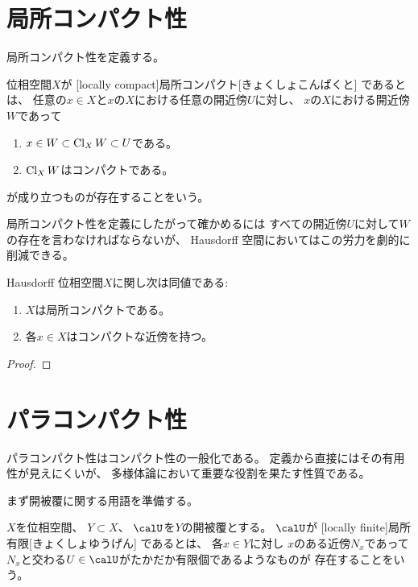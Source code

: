 \documentclass[report]{jlreq}
\begin{document}
\section{局所コンパクト性}

局所コンパクト性を定義する。

\begin{definition}[局所コンパクト]
    位相空間$X$が
    [locally compact]{局所コンパクト}[きょくしょこんぱくと]
    であるとは、
    任意の$x \in X$と$x$の$X$における任意の開近傍$U$に対し、
    $x$の$X$における開近傍$W$であって
    \begin{enumerate}
        \item $x \in W \subset \operatorname{Cl}_X W \subset U$である。
        \item $\operatorname{Cl}_X W$はコンパクトである。
    \end{enumerate}
    が成り立つものが存在することをいう。
\end{definition}

局所コンパクト性を定義にしたがって確かめるには
すべての開近傍$U$に対して$W$の存在を言わなければならないが、
Hausdorff 空間においてはこの労力を劇的に削減できる。

\begin{proposition}
    Hausdorff 位相空間$X$に関し次は同値である:
    \begin{enumerate}
        \item $X$は局所コンパクトである。
        \item 各$x \in X$はコンパクトな近傍を持つ。
    \end{enumerate}
\end{proposition}

\begin{proof}
    \TODO{}
\end{proof}

%
\section{パラコンパクト性}

パラコンパクト性はコンパクト性の一般化である。
定義から直接にはその有用性が見えにくいが、
多様体論において重要な役割を果たす性質である。

まず開被覆に関する用語を準備する。

\begin{definition}[局所有限]
    $X$を位相空間、
    $Y \subset X$、
    $\calU$を$Y$の開被覆とする。
    $\calU$が
    [locally finite]{局所有限}[きょくしょゆうげん]
    であるとは、
    各$x \in Y$に対し
    $x$のある近傍$N_x$であって
    $N_x$と交わる$U \in \calU$がたかだか有限個であるようなものが
    存在することをいう。
\end{definition}
\end{document}
